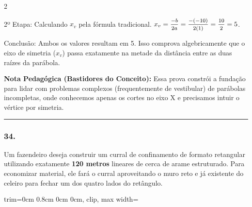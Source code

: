 \begin{multicols*}{2}
\begin{tcolorbox}[colback=CorTitUm!5, colframe=CorTitUm, boxrule=1pt, arc=4pt, left=6pt, right=6pt, top=6pt, bottom=6pt]
    2º Etapa: Calculando $x_v$ pela fórmula tradicional.
    $x_v = \mfrac{-b}{2a} = \mfrac{-(-10)}{2(1)} = \mfrac{10}{2} = 5$.
    
    Conclusão: Ambos os valores resultam em 5. Isso comprova algebricamente que o eixo de simetria ($x_v$) passa exatamente na metade da distância entre as duas raízes da parábola.
    \end{tcolorbox}
    \vspace{0.15cm}
    
    \begin{boxexplicacao}
    \textbf{Nota Pedagógica (Bastidores do Conceito):} Essa prova constrói a fundação para lidar com problemas complexos (frequentemente de vestibular) de parábolas incompletas, onde conhecemos apenas os cortes no eixo X e precisamos intuir o vértice por simetria.
    \end{boxexplicacao}
\fi

\par\vspace{\espacoQuestao}

\noindent\textcolor{CorLinha}{\rule{\linewidth}{0.5pt}} 
\par\vspace{\espacoPreQuestao}
\subsubsection*{34.} 
\begin{enunciadoLiteral}
Um fazendeiro deseja construir um curral de confinamento de formato retangular utilizando exatamente \textbf{120 metros} lineares de cerca de arame estruturado. Para economizar material, ele fará o curral aproveitando o muro reto e já existente do celeiro para fechar um dos quatro lados do retângulo.

\begin{center}
\begin{adjustbox}{trim=0cm 0.8cm 0cm 0cm, clip, max width=\larguraTikz}
\end{adjustbox}
\end{center}
\end{enunciadoLiteral}
\end{multicols*}

